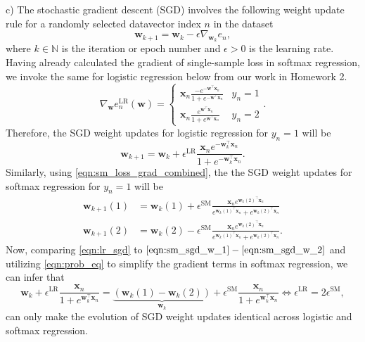 \documentclass{article}
\newcommand{\N}{\mathbb{N}}
\renewcommand{\vec}[1]{\mathbf{#1}}
\begin{document}
    c) The stochastic gradient descent (SGD) involves the following weight 
    update rule for a randomly selected datavector index $n$ in the dataset
    \begin{equation}
        \vec{w}_{k+1} = \vec{w}_k - \epsilon\nabla_{\vec{w}_k}e_n,
    \end{equation}
    where $k\in\N$ is the iteration or epoch number and $\epsilon>0$ is the 
    learning rate. Having already calculated the gradient of single-sample 
    loss in softmax regression, we invoke the same for logistic regression 
    below from our work in Homework 2.
    \begin{equation}
        \nabla_{\vec{w}}e_n^{\text{LR}}(\vec{w}) = 
        \begin{cases}
            \vec{x}_n\frac{-e^{-\vec{w}^\top\vec{x}_n}}{1+e^{-\vec{w}^\top\vec
            {x}_n}} & y_n = 1\\
            \vec{x}_n\frac{e^{\vec{w}^\top\vec{x}_n}}{1+e^{\vec{w}^\top\vec
            {x}_n}} & y_n = 2
        \end{cases}.
    \end{equation}
    Therefore, the SGD weight updates for logistic regression for $y_n=1$ 
    will be
    \begin{equation}
        \label{eqn:lr_sgd}
        \vec{w}_{k+1} = \vec{w}_k + \epsilon^{\text{LR}}
        \frac{\vec{x}_n e^{-\vec{w}_k^\top\vec{x}_n}}{1+e^{-\vec{w}_k^\top\vec
        {x}_n}}.
    \end{equation}
    Similarly, using \eqref{eqn:sm_loss_grad_combined}, the the SGD weight 
    updates for softmax regression for $y_n=1$ will be
    \begin{align}
        \label{eqn:sm_sgd_w_1}
        \vec{w}_{k+1}(1) &= \vec{w}_k(1) + \epsilon^{\text{SM}}\frac{\vec{x}_n
        e^{\vec{w}_k(2)^\top\vec{x}_n}}{e^{\vec{w}_k(1)^\top\vec{x}_n}+e^{\vec
        {w}_k(2)^\top\vec{x}_n}}\\
        \label{eqn:sm_sgd_w_2}
        \vec{w}_{k+1}(2) &= \vec{w}_k(2) - \epsilon^{\text{SM}}\frac{\vec{x}_n
        e^{\vec{w}_k(2)^\top\vec{x}_n}}{e^{\vec{w}_k(1)^\top\vec{x}_n}+e^{\vec
        {w}_k(2)^\top\vec{x}_n}}.
    \end{align} 
    Now, comparing \eqref{eqn:lr_sgd} to $\eqref{eqn:sm_sgd_w_1}
    -\eqref{eqn:sm_sgd_w_2}$ and utilizing \eqref{eqn:prob_eq} to simplify 
    the gradient terms in softmax regression, we can infer that
    \begin{equation}
        \vec{w}_k + \epsilon^{\text{LR}}\frac{\vec{x}_n}{1+e^{\vec{w}
        _k^\top\vec{x}_n}}=\underbrace{\left(\vec{w}_k(1)-\vec{w}_k(2)\right)}
        _{\vec{w}_k} + \epsilon^{\text{SM}}\frac{\vec{x}_n}{1+e^{\vec{w}_k
        ^\top\vec{x}_n}}
        \iff \epsilon^{\text{LR}} = 2\epsilon^{\text{SM}},
    \end{equation}
    can only make the evolution of SGD weight updates identical across 
    logistic and softmax regression.
\end{document}
